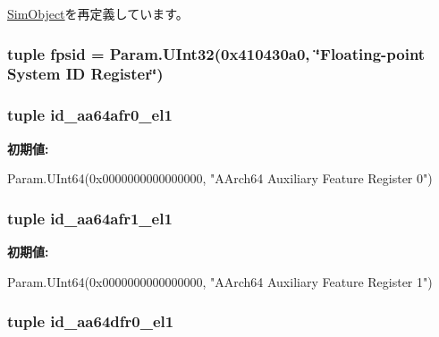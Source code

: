 \hyperlink{classm5_1_1SimObject_1_1SimObject_a17da7064bc5c518791f0c891eff05fda}{SimObject}を再定義しています。\hypertarget{classArmISA_1_1ArmISA_a343b37c88080e59b99f27bbba4952cbd}{
\subsubsection[{fpsid}]{\setlength{\rightskip}{0pt plus 5cm}tuple {\bf fpsid} = Param.UInt32(0x410430a0, \char`\"{}Floating-\/point System ID Register\char`\"{})}}
\label{classArmISA_1_1ArmISA_a343b37c88080e59b99f27bbba4952cbd}
\hypertarget{classArmISA_1_1ArmISA_a8a05160e092e263032d299855aff693a}{
\subsubsection[{id\_\-aa64afr0\_\-el1}]{\setlength{\rightskip}{0pt plus 5cm}tuple {\bf id\_\-aa64afr0\_\-el1}}}
\label{classArmISA_1_1ArmISA_a8a05160e092e263032d299855aff693a}
{\bfseries 初期値:}
\begin{DoxyCode}
Param.UInt64(0x0000000000000000,
        "AArch64 Auxiliary Feature Register 0")
\end{DoxyCode}
\hypertarget{classArmISA_1_1ArmISA_aad93eed9a0c27e7c2eee4d3466dc70d9}{
\subsubsection[{id\_\-aa64afr1\_\-el1}]{\setlength{\rightskip}{0pt plus 5cm}tuple {\bf id\_\-aa64afr1\_\-el1}}}
\label{classArmISA_1_1ArmISA_aad93eed9a0c27e7c2eee4d3466dc70d9}
{\bfseries 初期値:}
\begin{DoxyCode}
Param.UInt64(0x0000000000000000,
        "AArch64 Auxiliary Feature Register 1")
\end{DoxyCode}
\hypertarget{classArmISA_1_1ArmISA_a2acdc720c9a09cc3d721207930c48216}{
\subsubsection[{id\_\-aa64dfr0\_\-el1}]{\setlength{\rightskip}{0pt plus 5cm}tuple {\bf id\_\-aa64dfr0\_\-el1}}}
